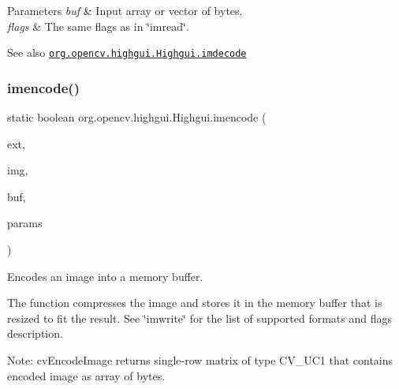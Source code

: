 \begin{DoxyParams}{Parameters}
{\em buf} & Input array or vector of bytes. \\
\hline
{\em flags} & The same flags as in \char`\"{}imread\char`\"{}.\\
\hline
\end{DoxyParams}
\begin{DoxySeeAlso}{See also}
\href{http://docs.opencv.org/modules/highgui/doc/reading_and_writing_images_and_video.html#imdecode}{\tt org.\+opencv.\+highgui.\+Highgui.\+imdecode} 
\end{DoxySeeAlso}
\mbox{\label{classorg_1_1opencv_1_1highgui_1_1_highgui_a884983c417b1783e2463afbce0ac7581}} 
\subsubsection{\texorpdfstring{imencode()}{imencode()}\hspace{0.1cm}{\footnotesize\ttfamily [1/2]}}
{\footnotesize\ttfamily static boolean org.\+opencv.\+highgui.\+Highgui.\+imencode (\begin{DoxyParamCaption}\item[{String}]{ext,  }\item[{\mbox{\hyperlink{classorg_1_1opencv_1_1core_1_1_mat}{Mat}}}]{img,  }\item[{\mbox{\hyperlink{classorg_1_1opencv_1_1core_1_1_mat_of_byte}{Mat\+Of\+Byte}}}]{buf,  }\item[{\mbox{\hyperlink{classorg_1_1opencv_1_1core_1_1_mat_of_int}{Mat\+Of\+Int}}}]{params }\end{DoxyParamCaption})\hspace{0.3cm}{\ttfamily [static]}}

Encodes an image into a memory buffer.

The function compresses the image and stores it in the memory buffer that is resized to fit the result. See \char`\"{}imwrite\char`\"{} for the list of supported formats and flags description.

Note\+: {\ttfamily cv\+Encode\+Image} returns single-\/row matrix of type {\ttfamily C\+V\+\_\+U\+C1} that contains encoded image as array of bytes.


